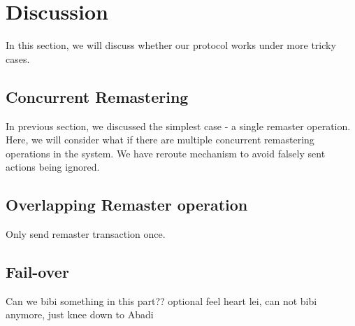 \section{Discussion}
In this section, we will discuss whether our protocol works under more tricky cases.
\subsection{Concurrent Remastering}
In previous section, we discussed the simplest case - a single remaster operation. Here, we will consider what if there are multiple concurrent remastering operations in the system. 
We have reroute mechanism to avoid falsely sent actions being ignored.

\subsection{Overlapping Remaster operation}
Only send remaster transaction once.


\subsection{Fail-over}
Can we bibi something in this part?? optional
feel heart lei, can not bibi anymore, just knee down to Abadi